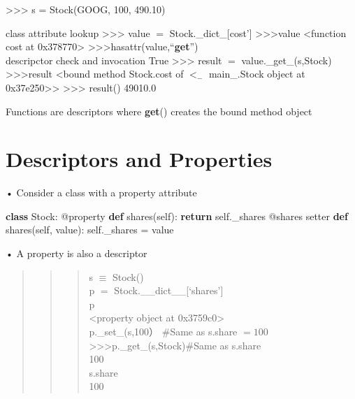 \documentclass[
  letterpaper,
  DIV=11,
  numbers=noendperiod]{scrreprt}
\newenvironment{Shaded}{\begin{snugshade}}{\end{snugshade}}
\newcommand{\ControlFlowTok}[1]{\textcolor[rgb]{0.00,0.23,0.31}{\textbf{#1}}}
\newcommand{\KeywordTok}[1]{\textcolor[rgb]{0.00,0.23,0.31}{\textbf{#1}}}
\newcommand{\NormalTok}[1]{\textcolor[rgb]{0.00,0.23,0.31}{#1}}
\newcommand{\OperatorTok}[1]{\textcolor[rgb]{0.37,0.37,0.37}{#1}}
\newcommand{\VariableTok}[1]{\textcolor[rgb]{0.07,0.07,0.07}{#1}}
\begin{document}
\begin{Shaded}
\begin{Highlighting}[]
\NormalTok{\textgreater{}\textgreater{}\textgreater{} s = Stock(\textquotesingle{}GOOG\textquotesingle{}, 100, 490.10) }
\end{Highlighting}
\end{Shaded}

class attribute lookup \textgreater\textgreater\textgreater{} value
\(=\) Stock.\_dict\_{[}cost'{]}
\textgreater\textgreater\textgreater value \textless function cost at
0x378770\textgreater{}
\textgreater\textgreater\textgreater hasattr(value,``\textbf{get}'')\\
descripctor check and invocation True
\textgreater\textgreater\textgreater{} result \(=\)
value.\_get\_(s,Stock) \textgreater\textgreater\textgreater result
\textless bound method Stock.cost of \(<  _{ - }\) main\_.Stock object
at 0x37e250\textgreater\textgreater{}
\textgreater\textgreater\textgreater{} result() 49010.0

Functions are descriptors where \textbf{get}() creates the bound method
object


\chapter{Descriptors and Properties}\label{descriptors-and-properties}

• Consider a class with a property attribute

\begin{Shaded}
\begin{Highlighting}[]
\KeywordTok{class}\NormalTok{ Stock: }\OperatorTok{@}\NormalTok{property }\KeywordTok{def}\NormalTok{ shares(}\VariableTok{self}\NormalTok{): }\ControlFlowTok{return} \VariableTok{self}\NormalTok{.\_shares }\OperatorTok{@}\NormalTok{shares setter }\KeywordTok{def}\NormalTok{ shares(}\VariableTok{self}\NormalTok{, value): }\VariableTok{self}\NormalTok{.\_shares }\OperatorTok{=}\NormalTok{ value }
\end{Highlighting}
\end{Shaded}

• A property is also a descriptor

\begin{quote}
\begin{quote}
\begin{quote}
s \(\equiv\) Stock()\\
p \(=\) Stock.\_\_dict\_\_{[}`shares'{]}\\
p\\
\textless property object at 0x3759c0\textgreater{}\\
p.\_set\_(s,100） \#Same as s.share \(= 100\)
\textgreater\textgreater\textgreater p.\_get\_(s,Stock)\#Same as
s.share\\
100\\
s.share\\
100
\end{quote}
\end{quote}
\end{quote}
\end{document}
